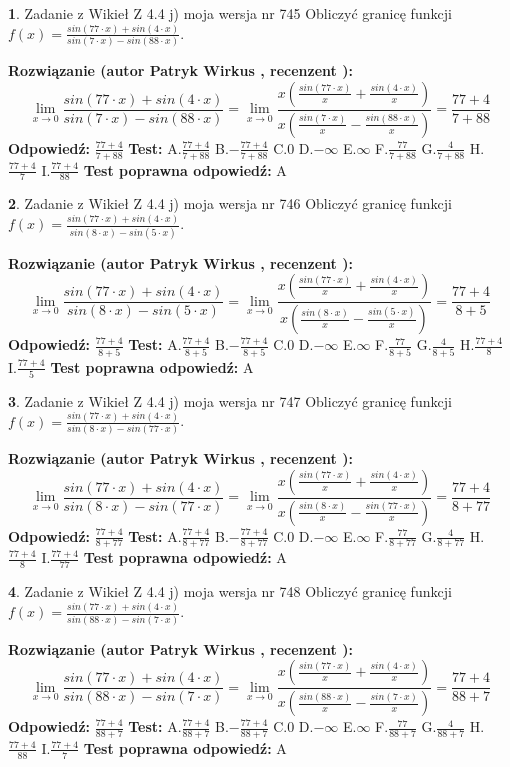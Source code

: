 \documentclass[12pt, a4paper]{article}
\theoremstyle{definition} %
\newtheorem{zad}{}
\newcommand{\zadStart}[1]{\begin{zad}#1\newline}
\newcommand{\zadStop}{\end{zad}}
\newcommand{\rozwStart}[2]{\noindent \textbf{Rozwiązanie (autor #1 , recenzent #2): }\newline}
\newcommand{\rozwStop}{\newline}
\newcommand{\odpStart}{\noindent \textbf{Odpowiedź:}\newline}
\newcommand{\odpStop}{\newline}
\newcommand{\testStart}{\noindent \textbf{Test:}\newline}
\newcommand{\testStop}{\newline}
\newcommand{\kluczStart}{\noindent \textbf{Test poprawna odpowiedź:}\newline}
\newcommand{\kluczStop}{\newline}
\begin{document}
\zadStart{Zadanie z Wikieł Z 4.4 j) moja wersja nr 745}
Obliczyć granicę funkcji $f(x)=\frac{sin(77\cdot x) +sin(4\cdot x)}{sin(7\cdot x) -sin(88\cdot x)}$.
\zadStop
\rozwStart{Patryk Wirkus}{}
$$\lim\limits_{x\to 0}\frac{sin(77\cdot x) +sin(4\cdot x)}{sin(7\cdot x) -sin(88\cdot x)}=\lim\limits_{x\to 0}\frac{x(\frac{sin(77\cdot x)}{x}+\frac{sin(4\cdot x)}{x})}{x(\frac{sin(7\cdot x)}{x}-\frac{sin(88\cdot x)}{x})}=\frac{77+4}{7+88}$$
\rozwStop
\odpStart
$\frac{77+4}{7+88}$
\odpStop
\testStart
A.$\frac{77+4}{7+88}$
B.$-\frac{77+4}{7+88}$
C.$0$
D.$-\infty$
E.$\infty$
F.$\frac{77}{7+88}$
G.$\frac{4}{7+88}$
H.$\frac{77+4}{7}$
I.$\frac{77+4}{88}$
\testStop
\kluczStart
A
\kluczStop



\zadStart{Zadanie z Wikieł Z 4.4 j) moja wersja nr 746}
Obliczyć granicę funkcji $f(x)=\frac{sin(77\cdot x) +sin(4\cdot x)}{sin(8\cdot x) -sin(5\cdot x)}$.
\zadStop
\rozwStart{Patryk Wirkus}{}
$$\lim\limits_{x\to 0}\frac{sin(77\cdot x) +sin(4\cdot x)}{sin(8\cdot x) -sin(5\cdot x)}=\lim\limits_{x\to 0}\frac{x(\frac{sin(77\cdot x)}{x}+\frac{sin(4\cdot x)}{x})}{x(\frac{sin(8\cdot x)}{x}-\frac{sin(5\cdot x)}{x})}=\frac{77+4}{8+5}$$
\rozwStop
\odpStart
$\frac{77+4}{8+5}$
\odpStop
\testStart
A.$\frac{77+4}{8+5}$
B.$-\frac{77+4}{8+5}$
C.$0$
D.$-\infty$
E.$\infty$
F.$\frac{77}{8+5}$
G.$\frac{4}{8+5}$
H.$\frac{77+4}{8}$
I.$\frac{77+4}{5}$
\testStop
\kluczStart
A
\kluczStop



\zadStart{Zadanie z Wikieł Z 4.4 j) moja wersja nr 747}
Obliczyć granicę funkcji $f(x)=\frac{sin(77\cdot x) +sin(4\cdot x)}{sin(8\cdot x) -sin(77\cdot x)}$.
\zadStop
\rozwStart{Patryk Wirkus}{}
$$\lim\limits_{x\to 0}\frac{sin(77\cdot x) +sin(4\cdot x)}{sin(8\cdot x) -sin(77\cdot x)}=\lim\limits_{x\to 0}\frac{x(\frac{sin(77\cdot x)}{x}+\frac{sin(4\cdot x)}{x})}{x(\frac{sin(8\cdot x)}{x}-\frac{sin(77\cdot x)}{x})}=\frac{77+4}{8+77}$$
\rozwStop
\odpStart
$\frac{77+4}{8+77}$
\odpStop
\testStart
A.$\frac{77+4}{8+77}$
B.$-\frac{77+4}{8+77}$
C.$0$
D.$-\infty$
E.$\infty$
F.$\frac{77}{8+77}$
G.$\frac{4}{8+77}$
H.$\frac{77+4}{8}$
I.$\frac{77+4}{77}$
\testStop
\kluczStart
A
\kluczStop



\zadStart{Zadanie z Wikieł Z 4.4 j) moja wersja nr 748}
Obliczyć granicę funkcji $f(x)=\frac{sin(77\cdot x) +sin(4\cdot x)}{sin(88\cdot x) -sin(7\cdot x)}$.
\zadStop
\rozwStart{Patryk Wirkus}{}
$$\lim\limits_{x\to 0}\frac{sin(77\cdot x) +sin(4\cdot x)}{sin(88\cdot x) -sin(7\cdot x)}=\lim\limits_{x\to 0}\frac{x(\frac{sin(77\cdot x)}{x}+\frac{sin(4\cdot x)}{x})}{x(\frac{sin(88\cdot x)}{x}-\frac{sin(7\cdot x)}{x})}=\frac{77+4}{88+7}$$
\rozwStop
\odpStart
$\frac{77+4}{88+7}$
\odpStop
\testStart
A.$\frac{77+4}{88+7}$
B.$-\frac{77+4}{88+7}$
C.$0$
D.$-\infty$
E.$\infty$
F.$\frac{77}{88+7}$
G.$\frac{4}{88+7}$
H.$\frac{77+4}{88}$
I.$\frac{77+4}{7}$
\testStop
\kluczStart
A
\kluczStop
\end{document}
